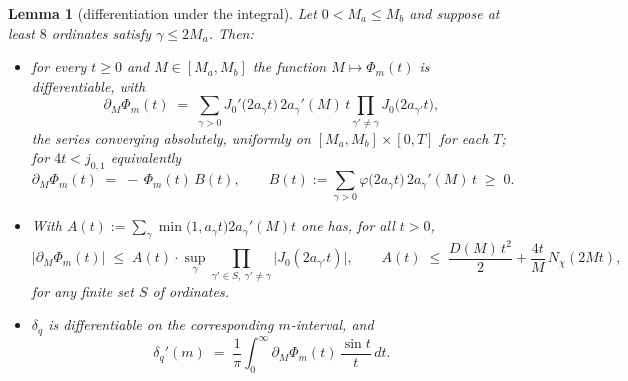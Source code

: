 \documentclass[11pt]{article}
\newtheorem{lemma}{Lemma}
\begin{document}
\begin{lemma}[differentiation under the integral]\label{lem:diffint}
Let $0<M_a\le M_b$ and suppose at least $8$ ordinates satisfy
$\gamma\le2M_a$. Then:
\begin{itemize}
\item[(a)] for every $t\ge0$ and $M\in[M_a,M_b]$ the function
$M\mapsto\Phi_m(t)$ is differentiable, with
\begin{equation}\label{eq:dPhi}
\partial_M\Phi_m(t)\;=\;\sum_{\gamma>0}
J_0'\bigl(2a_\gamma t\bigr)\,2a_\gamma'(M)\,t
\prod_{\gamma'\ne\gamma}J_0\bigl(2a_{\gamma'}t\bigr),
\end{equation}
the series converging absolutely, uniformly on
$[M_a,M_b]\times[0,T]$ for each $T$; for $4t<j_{0,1}$ equivalently
\begin{equation}\label{eq:dPhiLog}
\partial_M\Phi_m(t)\;=\;-\,\Phi_m(t)\,B(t),
\qquad
B(t):=\sum_{\gamma>0}\varphi\bigl(2a_\gamma t\bigr)\,2a_\gamma'(M)\,t
\;\ge\;0 .
\end{equation}
\item[(b)] With
$A(t):=\sum_\gamma\min\bigl(1,a_\gamma t\bigr)2a_\gamma'(M)t$ one has,
for all $t>0$,
\begin{equation}\label{eq:Abound}
|\partial_M\Phi_m(t)|\;\le\;A(t)\cdot
\sup_{\gamma}\prod_{\gamma'\in S,\ \gamma'\ne\gamma}
\bigl|J_0(2a_{\gamma'}t)\bigr|,
\qquad
A(t)\;\le\;\frac{D(M)\,t^2}{2}+\frac{4t}{M}\,N_\chi(2Mt),
\end{equation}
for any finite set $S$ of ordinates.
\item[(c)] $\delta_q$ is differentiable on the corresponding
$m$-interval, and
\[
\delta_q'(m)\;=\;\frac1\pi\int_0^\infty
\partial_M\Phi_m(t)\,\frac{\sin t}{t}\,dt .
\]
\end{itemize}
\end{lemma}
\end{document}
